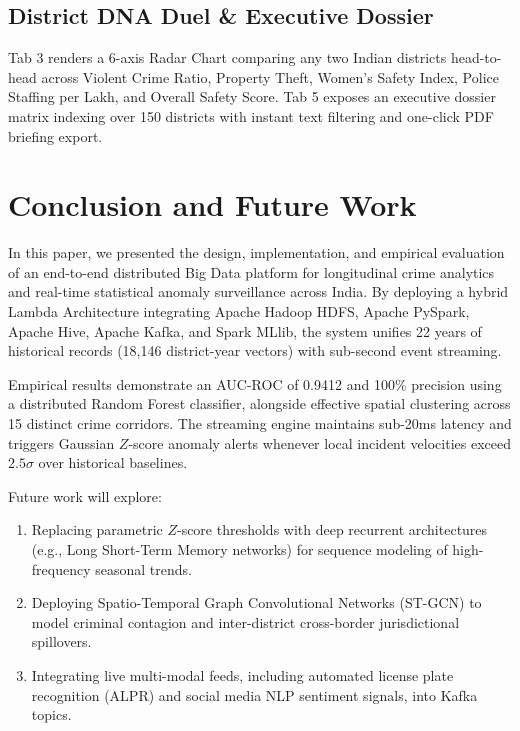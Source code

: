 \documentclass[conference]{IEEEtran}
\begin{document}
\subsection{District DNA Duel \& Executive Dossier}
Tab 3 renders a 6-axis Radar Chart comparing any two Indian districts head-to-head across Violent Crime Ratio, Property Theft, Women's Safety Index, Police Staffing per Lakh, and Overall Safety Score. Tab 5 exposes an executive dossier matrix indexing over 150 districts with instant text filtering and one-click PDF briefing export.

\section{Conclusion and Future Work}
In this paper, we presented the design, implementation, and empirical evaluation of an end-to-end distributed Big Data platform for longitudinal crime analytics and real-time statistical anomaly surveillance across India. By deploying a hybrid Lambda Architecture integrating Apache Hadoop HDFS, Apache PySpark, Apache Hive, Apache Kafka, and Spark MLlib, the system unifies 22 years of historical records (18,146 district-year vectors) with sub-second event streaming. 

Empirical results demonstrate an AUC-ROC of 0.9412 and 100\% precision using a distributed Random Forest classifier, alongside effective spatial clustering across 15 distinct crime corridors. The streaming engine maintains sub-20ms latency and triggers Gaussian $Z$-score anomaly alerts whenever local incident velocities exceed $2.5\sigma$ over historical baselines.

Future work will explore:
\begin{enumerate}
    \item Replacing parametric $Z$-score thresholds with deep recurrent architectures (e.g., Long Short-Term Memory networks) for sequence modeling of high-frequency seasonal trends.
    \item Deploying Spatio-Temporal Graph Convolutional Networks (ST-GCN) to model criminal contagion and inter-district cross-border jurisdictional spillovers.
    \item Integrating live multi-modal feeds, including automated license plate recognition (ALPR) and social media NLP sentiment signals, into Kafka topics.
\end{enumerate}
\end{document}
